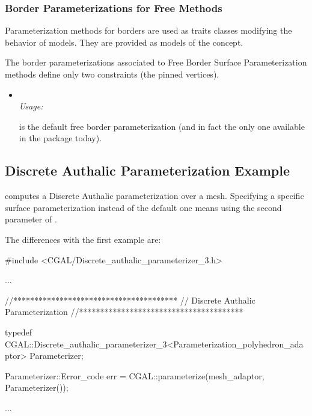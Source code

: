 \subsubsection{Border Parameterizations for Free Methods}
\label{sec:Border-Parameterizations-for-Free-Methods}

Parameterization methods for
borders are used as traits classes modifying the behavior of
 models.
They are provided as models of the  concept.

The border parameterizations associated to Free Border Surface
Parameterization methods define only two constraints
(the pinned vertices). 

\begin{itemize}

\item
      \\

    \emph{Usage:}

     is the default
    free border parameterization (and in fact the only one available
    in the package today).

\end{itemize}


\subsection{Discrete Authalic Parameterization Example}

 computes a Discrete Authalic parameterization
over a  mesh. Specifying a specific surface parameterization
instead of the default one means using the second parameter of .

The differences with the first example  are:

\begin{ccExampleCode}

#include <CGAL/Discrete_authalic_parameterizer_3.h>

...

//***************************************
// Discrete Authalic Parameterization
//***************************************

typedef CGAL::Discrete_authalic_parameterizer_3<Parameterization_polyhedron_adaptor>
                                                    Parameterizer;

Parameterizer::Error_code err = CGAL::parameterize(mesh_adaptor, Parameterizer());

...

\end{ccExampleCode}



